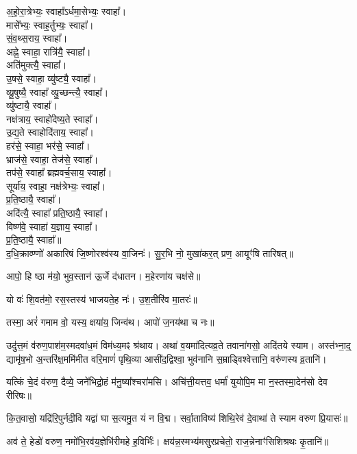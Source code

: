 अ॒हो॒रा॒त्रेभ्यः॒ स्वाहा᳚ऽर्धमा॒सेभ्यः॒ स्वाहा᳚।\\
मासे᳚भ्यः॒ स्वाह॒र्तुभ्यः॒ स्वाहा᳚।\\
सं॒व॒थ्स॒राय॒ स्वाहा᳚।\\
अह्ने॒ स्वाहा॒ रात्रि॑यै॒ स्वाहा᳚।\\
अति॑मुक्त्यै॒ स्वाहा᳚।\\
उ॒षसे॒ स्वाहा॒ व्यु॑ष्ट्यै॒ स्वाहा᳚।\\
व्यू॒षुष्यै॒ स्वाहा᳚ व्यु॒च्छन्त्यै॒ स्वाहा᳚।\\
व्यु॑ष्टायै॒ स्वाहा᳚।\\
नक्ष॑त्राय॒ स्वाहो॑देष्य॒ते स्वाहा᳚।\\
उ॒द्य॒ते स्वाहोदि॑ताय॒ स्वाहा᳚।\\
हर॑से॒ स्वाहा॒ भर॑से॒ स्वाहा᳚।\\
भ्राज॑से॒ स्वाहा॒ तेज॑से॒ स्वाहा᳚।\\
तप॑से॒ स्वाहा᳚ ब्रह्मवर्च॒साय॒ स्वाहा᳚।\\
सूर्या॑य॒ स्वाहा॒ नक्ष॑त्रेभ्यः॒ स्वाहा᳚।\\
प्र॒ति॒ष्ठायै॒ स्वाहा᳚।\\
अदि॑त्यै॒ स्वाहा᳚ प्रति॒ष्ठायै॒ स्वाहा᳚।\\
विष्ण॑वे॒ स्वाहा॑ य॒ज्ञाय॒ स्वाहा᳚।\\
प्र॒ति॒ष्ठायै॒ स्वाहा᳚॥\\

द॒धि॒क्राव्ण्णो॑ अकारिषं जि॒ष्णोरश्व॑स्य वा॒जिनः॑।
सु॒र॒भि नो॒ मुखा॑कर॒त् प्रण॒ आयूꣳ॑षि तारिषत्॥

आपो॒ हि ष्ठा म॑यो॒ भुव॒स्तान॑ ऊ॒र्जे द॑धातन। म॒हेरणा॑य चक्ष॑से॥

यो वः॑ शि॒वत॑मो॒ रस॒स्तस्य॑ भाजयते॒ह नः॑। उ॒श॒तीरि॑व मा॒तरः॑॥

तस्मा॒ अरं॑ गमाम वो॒ यस्य॒ क्षया॑य॒ जिन्व॑थ। आपो॑ ज॒नय॑था च नः॥

उदु॑त्त॒मं व॑रुण॒पाश॑म॒स्मदवा॑ध॒मं विम॑ध्य॒मꣴ श्र॑थाय।
अथा॑ व॒यमा॑दित्यव्र॒ते तवाना॑गसो॒ अदि॑तये स्याम।
अस्त॑भ्ना॒द्॒ द्यामृ॑ष॒भो अ॒न्तरि॑क्ष॒ममि॑मीत वरि॒माणं॑ पृथि॒व्या
आसी॑द॒द्विश्वा॒ भुव॑नानि स॒म्राड्विश्वेत्तानि॒ वरु॑णस्य व्र॒तानि॑।

यत्किं चे॒दं व॑रुण॒ दैव्ये॒ जने॑भिद्रो॒हं म॑नु॒ष्या᳚श्चरा॑मसि। 
अचि॑त्ती॒यत्तव॒ धर्मा॑ युयोपि॒म मा न॒स्तस्मा॒देन॑सो देव रीरिषः॥

कि॒त॒वासो॒ यद्रि॑रि॒पुर्नदी॒वि यद्वा॑ घा स॒त्यमु॒त यं न वि॒द्म। 
सर्वा॒ताविष्य॑ शिथि॒रेव॑ दे॒वाथा॑ ते स्याम वरुण प्रि॒यासः॑॥

अव॑ ते॒ हेडो॑ वरुण॒ नमो॑भि॒रव॑य॒ज्ञेभि॑रीमहे ह॒विर्भिः॑।
क्षय॑न्न॒स्मभ्य॑मसुरप्रचेतो॒ राज॒न्नेनाꣳ॑सिशिश्रथः कृ॒तानि॑॥

